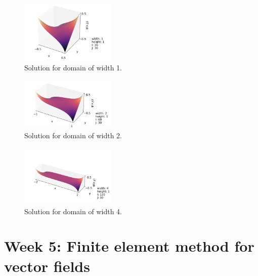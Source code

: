 \documentclass[acmtog]{acmart}
\begin{document}
\graphicspath{{Images/Week4/exp2/}}
\begin{figure}[t]
  \centering
  \includegraphics[width = 0.4\textwidth]{widths_0.png}
  \caption{Solution for domain of width 1.\label{fig:w4exp2_0}}
\end{figure}
\begin{figure}[t]
  \centering
  \includegraphics[width = 0.4\textwidth]{widths_1.png}
  \caption{Solution for domain of width 2.\label{fig:w4exp2_1}}
\end{figure}
\begin{figure}[t]
  \centering
  \includegraphics[width = 0.4\textwidth]{widths_2.png}
  \caption{Solution for domain of width 4.\label{fig:w4exp2_2}}
\end{figure}



\vspace{12pt}
\section*{\textbf{Week 5: Finite element method for vector fields}}
\end{document}
